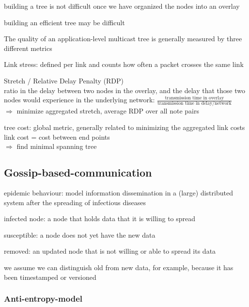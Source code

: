 \documentclass[ngerman,a4paper]{report}
\begin{document}
\begin{compactitem}
	\item building a tree is not difficult once we have organized the nodes into an overlay
	\item building an efficient tree may be difficult
	\item The quality of an application-level multicast tree is generally measured by three different metrics
	\begin{compactenum}
		\item Link stress: defined per link and counts how often a packet crosses the same link
		\item Stretch / Relative Delay Penalty (RDP)\\
			ratio in the delay between two nodes in the overlay, and the delay that those two nodes would experience in the underlying network: 
			$\frac{\text{transmission time in overlay}}{\text{transmission time in delay/network}}$ \\
			$\Rightarrow$ minimize aggregated stretch, average RDP over all note pairs
		\item tree cost: global metric, generally related to minimizing the aggregated link costs \\
			link cost = cost between end points\\
				$\Rightarrow$ find minimal spanning tree	
	\end{compactenum}
\end{compactitem}

\subsection{Gossip-based-communication}
\begin{compactitem}
	\item epidemic behaviour: model information dissemination in a (large) distributed system after the spreading of infectious diseases
	\item infected node: a node that holds data that it is willing to spread 
	\item susceptible: a node does not yet have the new data
	\item removed: an updated node that is not willing or able to spread its data 
	\item we assume we can distinguish old from new data, for example, because it has been timestamped or versioned
\end{compactitem}

\subsubsection*{Anti-entropy-model}
\end{document}
